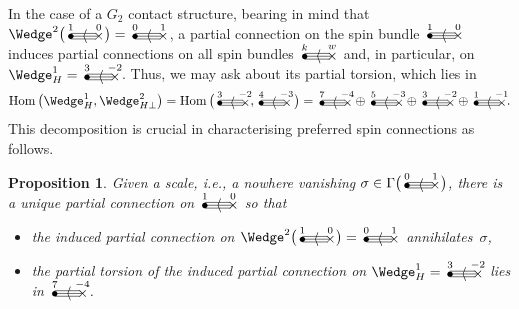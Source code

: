 \documentclass[10pt,a4paper]{amsart}
\numberwithin{equation}{section}
\newtheorem{prop}[Theorem]{Proposition}
 { \theoremstyle{definition}
\newtheorem{Definition}[Theorem]{Definition}
\newtheorem{Note}[Theorem]{Note}
\newtheorem{Example}[Theorem]{Example}
\newtheorem{Remark}[Theorem]{Remark} }
\newcommand{\Hom}{\operatorname{Hom}}
\newcommand{\gtwo}[2]{\begin{picture}(28,10)
\put(4,1.1){\makebox(0,0){$\bullet$}}
\put(24,1.5){\makebox(0,0){$\times$}}
\put(4,3.5){\line(1,0){18}}
\put(4,1.5){\line(1,0){20}}
\put(4,-.5){\line(1,0){18}}
\put(14,1.5){\makebox(0,0){$\langle$}}
\put(4,8){\makebox(0,0){$\scriptstyle #1$}}
\put(24,8){\makebox(0,0){$\scriptstyle #2$}}
\end{picture}}
\begin{document}
In the case of a $G_2$ contact structure, bearing in mind that
$\Wedge^2\big(\gtwo{1}{0}\big)=\gtwo{0}{1}$, a partial connection on the spin bundle
$\gtwo{1}{0}$ induces partial connections on all spin bundles $\gtwo{k}{w}$
and, in particular, on $\Wedge_H^1=\gtwo{3}{-2}$. Thus, we may ask about
its partial torsion, which lies in
\begin{equation}\label{partial_torsion_decomposition}
\Hom\big({\Wedge}_H^1,\Wedge_{H\perp}^2\big)=\Hom\big(\gtwo{3}{-2},\gtwo{4}{-3}\,\big)
=\gtwo{7}{-4}\oplus\gtwo{5}{-3}\oplus\gtwo{3}{-2}\oplus\gtwo{1}{-1}.
\end{equation}
This decomposition is crucial in characterising preferred spin connections as
follows.

\begin{prop}\label{three}
Given a scale, i.e., a nowhere vanishing $\sigma\in\Gamma\big(\gtwo{0}{1}\big)$, there
is a unique partial connection on $\gtwo{1}{0}$ so that
\begin{itemize}\itemsep=0pt
\item the induced partial connection on $\Wedge^2\big(\gtwo{1}{0}\big)=\gtwo{0}{1}$
annihilates~$\sigma$,
\item the partial torsion of the induced partial connection on $\Wedge_H^1=\gtwo{3}{-2}$ lies in $\gtwo{7}{-4}$.
\end{itemize}
\end{prop}
\end{document}
